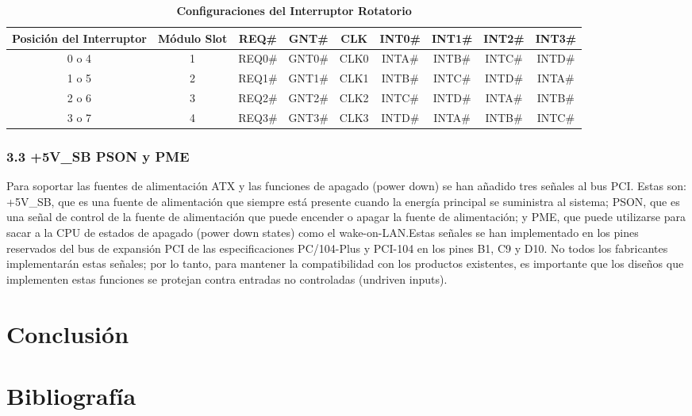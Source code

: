 \documentclass[12pt]{article}
\begin{document}
	\begin{table}[h!]
		\centering
		\caption{\textbf{Configuraciones del Interruptor Rotatorio}}
		\label{tab:rotary_switch_settings}
		\small 
		\begin{tabular}{|c|c|c|c|c|c|c|c|c|}
			\hline
			\textbf{Posición del Interruptor} & \textbf{Módulo Slot} & \textbf{REQ\#} & \textbf{GNT\#} & \textbf{CLK} & \textbf{INT0\#} & \textbf{INT1\#} & \textbf{INT2\#} & \textbf{INT3\#} \\
			\hline
			0 o 4 & 1 & REQ0\# & GNT0\# & CLK0 & INTA\# & INTB\# & INTC\# & INTD\# \\
			\hline
			1 o 5 & 2 & REQ1\# & GNT1\# & CLK1 & INTB\# & INTC\# & INTD\# & INTA\# \\
			\hline
			2 o 6 & 3 & REQ2\# & GNT2\# & CLK2 & INTC\# & INTD\# & INTA\# & INTB\# \\
			\hline
			3 o 7 & 4 & REQ3\# & GNT3\# & CLK3 & INTD\# & INTA\# & INTB\# & INTC\# \\
			\hline
		\end{tabular}
	\end{table}
	
	\subsubsection*{3.3 +5V\_SB PSON y PME}
		Para soportar las fuentes de alimentación ATX y las funciones de apagado (power down) se han añadido tres señales al bus PCI. Estas son: +5V\_SB, que es una fuente de alimentación que siempre está presente cuando la energía principal se suministra al sistema; PSON, que es una señal de control de la fuente de alimentación que puede encender o apagar la fuente de alimentación; y PME, que puede utilizarse para sacar a la CPU de estados de apagado (power down states) como el wake-on-LAN.Estas señales se han implementado en los pines reservados del bus de expansión PCI de las especificaciones PC/104-Plus y PCI-104 en los pines B1, C9 y D10. No todos los fabricantes implementarán estas señales; por lo tanto, para mantener la compatibilidad con los productos existentes, es importante que los diseños que implementen estas funciones se protejan contra entradas no controladas (undriven inputs).
	
	
	
	
	
	\newpage
	\section{Conclusión}
	
	
	\newpage
	\section{Bibliografía}
	\printbibliography
	
	
\end{document}
